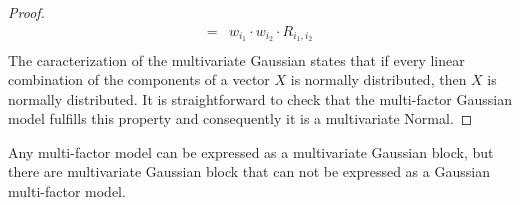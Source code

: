 \documentclass[11pt,fleqn]{book} %
\begin{document}
\begin{proof}
\begin{displaymath}
\begin{array}{rl}
			=                                         & w_{i_1} \cdot w_{i_2} \cdot R_{i_1,i_2}                                                                    \\
		\end{array}
	\end{displaymath}
	The caracterization of the multivariate Gaussian \cite[thm 2.6.2]{anderson:1984}
	states that if every linear combination of the components of a 
	vector $X$ is normally distributed, then $X$ is normally distributed.
	It is straightforward to check that the multi-factor Gaussian model 
	fulfills this property and consequently it is a multivariate Normal.
\end{proof}

\begin{proposition}
	Any multi-factor model can be expressed as a multivariate Gaussian 
	block, but there are multivariate Gaussian block that can not be 
	expressed as a Gaussian multi-factor model.
\end{proposition}
\end{document}
